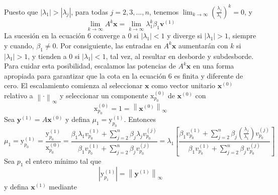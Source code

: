 \documentclass{report}
\numberwithin{subsection}{section} %
\begin{document}
Puesto que $\left| \lambda_{1} \right| > \left| \lambda_{j} \right|$, para todas $j = 2, 3, ..., n$, tenemos $\lim_{k \to \infty } \left( \frac{\lambda_{j}}{\lambda_{1}} \right)^{k} = 0$, y
\begin{equation}
\lim_{k \to \infty } A^{k} \textbf{x} = \lim_{k \to \infty } \lambda_{1}^{k} \beta_{1} \textbf{v}^{\left( 1 \right)}
\end{equation}
La sucesión en la ecuación 6 converge a $0$ si $\left| \lambda_{1} \right| < 1$ y diverge si $\left| \lambda_{1} \right| > 1$, siempre y cuando, $\beta_{1} \neq 0$. Por consiguiente, las entradas en $A^{k} \textbf{x}$ aumentarán con $k$ si $\left| \lambda_{1} \right| > 1$, y tienden a $0$ si $\left| \lambda_{1} \right| < 1$, tal vez, al resultar en desborde y subdesborde. Para cuidar esta posibilidad, escalamos las potencias de $A^{k} \textbf{x}$ en una forma apropiada para garantizar que la cota en la ecuación 6 es finita y diferente de cero. El escalamiento comienza al seleccionar $\textbf{x}$ como vector unitario $\textbf{x}^{\left( 0 \right)}$ relativo a $\left\| \cdot \right\|_{\infty }$ y seleccionar un componente $\text{x}_{p_{0}}^{\left( 0 \right)}$ de $\textbf{x}^{\left( 0 \right)}$ con
\begin{equation*}
\text{x}_{p_{0}}^{\left( 0 \right)} = 1 = \left\| \textbf{x}^{\left( 0 \right)} \right\|_{\infty }
\end{equation*}
Sea $\textbf{y}^{\left( 1 \right)} = A \textbf{x}^{\left( 0 \right)}$ y defina $\mu_{1} = \text{y}_{p_{0}}^{\left( 1 \right)}$. Entonces
\begin{equation*}
\mu_{1} = \text{y}_{p_{0}}^{\left( 1 \right)} = \frac{\text{y}_{p_{0}}^{\left( 1 \right)}}{\text{x}_{p_{0}}^{\left( 0 \right)}} = \frac{\beta_{1} \lambda_{1} v_{p_{0}}^{\left( 1 \right)}+\sum_{j = 2}^{n}\beta_{j} \lambda_{j} v_{p_{0}}^{\left( j \right)}}{\beta_{1} v_{p_{0}}^{\left( 1 \right)}+\sum_{j = 2}^{n}\beta_{j} v_{p_{0}}^{\left( j \right)}} = \lambda_{1} \left[ \frac{\beta_{1} v_{p_{0}}^{\left( 1 \right)}+\sum_{j = 2}^{n}\beta_{j} \left( \frac{\lambda_{j}}{\lambda_{1}} \right) v_{p_{0}}^{\left( j \right)}}{\beta_{1} v_{p_{0}}^{\left( 1 \right)}+\sum_{j = 2}^{n}\beta_{j}v_{p_{0}}^{\left( j \right)}} \right]
\end{equation*}
Sea $p_{1}$ el entero mínimo tal que
\begin{equation*}
\left| \text{y}_{p_{1}}^{\left( 1 \right)} \right| = \left\| \textbf{y}^{\left( 1 \right)} \right\|_{\infty }
\end{equation*}
y defina $\textbf{x}^{\left( 1 \right)}$ mediante
\end{document}
